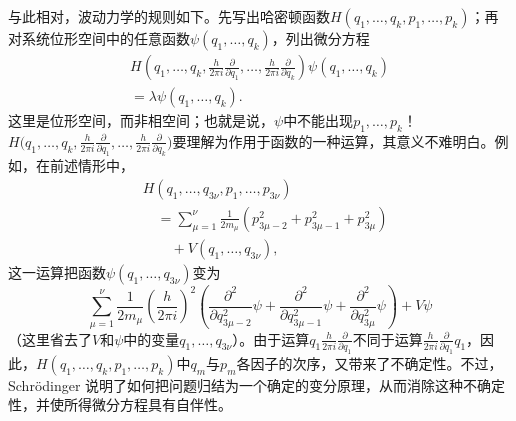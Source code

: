 \documentclass[fontsize=13pt,twoside,openany,headings=normal,parskip=false,bookmarkpackage=false,DIV=calc]{scrbook}
\begin{document}
与此相对，波动力学的规则如下。先写出哈密顿函数$H(q_1,\allowbreak \ldots,\allowbreak q_k,\allowbreak p_1,\allowbreak \ldots,\allowbreak p_k)$；再对系统位形空间中的任意函数$\psi(q_1,\allowbreak \ldots,\allowbreak q_k)$，列出微分方程
\begin{gather*}
 H\left(q_1,\ldots,q_k,\frac{h}{2\pi i}\frac{\partial}{\partial q_1},
 \ldots,\frac{h}{2\pi i}\frac{\partial}{\partial q_k}\right)\psi(q_1,\ldots,q_k)\\
 =\lambda\psi(q_1,\ldots,q_k).
\end{gather*}
这里是位形空间，而非相空间；也就是说，$\psi$中不能出现$p_1,\allowbreak \ldots,\allowbreak p_k$！$H\bigl(q_1,\allowbreak \ldots,\allowbreak q_k,\allowbreak \frac{h}{2\pi i}\frac{\partial}{\partial q_1},\allowbreak \ldots,\allowbreak \frac{h}{2\pi i}\frac{\partial}{\partial q_k}\bigr)$要理解为作用于函数的一种运算，其意义不难明白。例如，在前述情形中，
\begin{align*}
 &H(q_1,\ldots,q_{3\nu},p_1,\ldots,p_{3\nu})\\
 &\quad=\sum_{\mu=1}^{\nu}\frac{1}{2m_\mu}(p_{3\mu-2}^2+p_{3\mu-1}^2+p_{3\mu}^2)\\
 &\qquad+V(q_1,\ldots,q_{3\nu}),
\end{align*}
这一运算把函数$\psi(q_1,\allowbreak \ldots,\allowbreak q_{3\nu})$变为
\[
 \sum_{\mu=1}^{\nu}\frac{1}{2m_\mu}\left(\frac{h}{2\pi i}\right)^2
 \left(\frac{\partial^2}{\partial q_{3\mu-2}^2}\psi
 +\frac{\partial^2}{\partial q_{3\mu-1}^2}\psi
 +\frac{\partial^2}{\partial q_{3\mu}^2}\psi\right)+V\psi
\]\hypertarget{origpage-8}{}\label{origpage-8}（这里省去了$V$和$\psi$中的变量$q_1,\allowbreak \ldots,\allowbreak q_{3\nu}$）。由于运算$q_1\frac{h}{2\pi i}\frac{\partial}{\partial q_1}$不同于运算$\frac{h}{2\pi i}\frac{\partial}{\partial q_1}q_1$，因此，$H(q_1,\allowbreak \ldots,\allowbreak q_k,\allowbreak p_1,\allowbreak \ldots,\allowbreak p_k)$中$q_m$与$p_m$各因子的次序，又带来了不确定性。不过，Schrödinger 说明了如何把问题归结为一个确定的变分原理，从而消除这种不确定性，并使所得微分方程具有自伴性。
\end{document}
